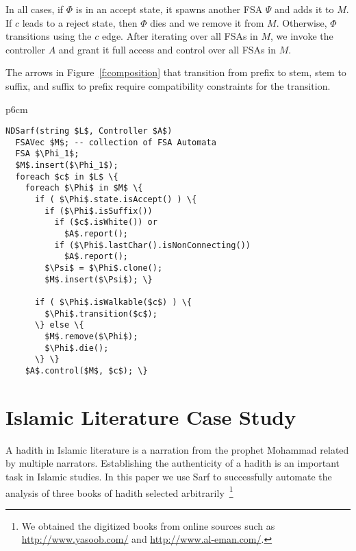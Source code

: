 \documentclass[11pt,letterpaper]{article}
\begin{document}
In all cases, if $\Phi$ is in an accept state, 
it spawns another FSA $\Psi$ and adds it to $M$. 
If $c$ leads to a reject state, then $\Phi$ dies 
and we remove it from $M$. 
Otherwise, $\Phi$ transitions using the $c$ edge.
After iterating over all FSAs in $M$, we invoke the 
controller $A$
and grant it full access and control over
all FSAs in $M$. 

The arrows in Figure~\ref{f:composition} that transition
from prefix to stem, stem to suffix, and suffix to prefix
require compatibility constraints for 
the transition.

\begin{table}[tb]
\centering
\begin{tabular} {p{6cm}}
\begin{Verbatim}[fontsize=\relsize{-1},
frame=topline,framesep=4mm,label=\fbox{NDSarf algorithm},
commandchars=\\\{\}, codes={\catcode`$=3\catcode`_=8}]
NDSarf(string $L$, Controller $A$) 
  FSAVec $M$; -- collection of FSA Automata
  FSA $\Phi_1$;
  $M$.insert($\Phi_1$);
  foreach $c$ in $L$ \{
    foreach $\Phi$ in $M$ \{
      if ( $\Phi$.state.isAccept() ) \{
        if ($\Phi$.isSuffix())
          if ($c$.isWhite()) or 
            $A$.report();
          if ($\Phi$.lastChar().isNonConnecting())
            $A$.report();
        $\Psi$ = $\Phi$.clone();
        $M$.insert($\Psi$); \}

      if ( $\Phi$.isWalkable($c$) ) \{
        $\Phi$.transition($c$);
      \} else \{
        $M$.remove($\Phi$);
        $\Phi$.die();
      \} \} 
    $A$.control($M$, $c$); \}
\end{Verbatim}
\end{tabular}
\label{a:ndsarf}
\end{table}

\section{Islamic Literature Case Study}
\label{sec:islamic}

A hadith in Islamic literature is a narration from the prophet Mohammad
related by multiple narrators.
Establishing the authenticity of a hadith is an important task
in Islamic studies. 
In this paper we use Sarf to successfully automate the
analysis of three books of hadith selected 
arbitrarily~\cite{IbnHanbal,AlKulayni,AlTousi}\footnote{We obtained
  the digitized books from online sources such as 
  \href{http://www.yasoob.com/}{http://www.yasoob.com/} and 
  \href{http://www.al-eman.com/}{http://www.al-eman.com/}. }
\end{document}
